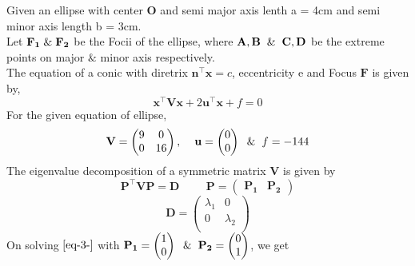 \documentclass[journal,10pt,twocolumn]{article}
\let\vec\mathbf
\newcommand{\myvec}[1]{\ensuremath{\begin{pmatrix}#1\end{pmatrix}}}
\begin{document}
{\raggedright Given an ellipse with center $\vec{O}$ and semi major axis lenth a = 4cm and semi  minor axis length b = 3cm. \vspace{2mm}
\\Let $\vec{F_1} \hspace{1mm} \& \hspace{1mm} \vec{F_2}$ be the Focii of the ellipse, where $\vec{A},\vec{B} \hspace{2mm} \& \hspace{2mm} \vec{C},\vec{D}$ be the extreme points on major $\&$ minor axis respectively. \vspace{2mm}
\\The equation of a conic with diretrix $\vec{n}^{\top}\vec{x} = c$, eccentricity e and Focus $\vec{F}$ is given by,
\begin{equation}
\vec{x}^{\top}\vec{V}\vec{x}+2\vec{u}^{\top}\vec{x}+f=0
\label{eq-1-}
\end{equation}
For the given equation of ellipse,
\begin{equation}
\vec{V} = \begin{pmatrix} 
	9 & 0 \\
	0 & 16 \\
	\end{pmatrix}, \hspace{4mm} \vec{u} = \myvec{0 \\ 0} \hspace{2mm} \& \hspace{2mm} f = -144
\label{eq-2-}
\end{equation}
The eigenvalue decomposition of a symmetric matrix $\vec{V}$ is given by
\begin{equation}
\vec{P}^{\top}\vec{V}\vec{P} = \vec{D} \hspace{1cm} 
\vec{P} = \myvec{\vec{P_1} & \vec{P_2}} 
\label{eq-3-}
\end{equation}
\begin{equation}
\vec{D} = \begin{pmatrix} 
	\lambda_1 & 0 \\
	0 & \lambda_2 \\
	\end{pmatrix} 
\label{eq-4-}
\end{equation}
On solving $\eqref{eq-3-}$ with $\vec{P_1} = \myvec{1 \\ 0} \hspace{2mm} \& \hspace{2mm} \vec{P_2} = \myvec{0 \\ 1}$, we get
\begin{equation}

\end{equation}}
\end{document}
